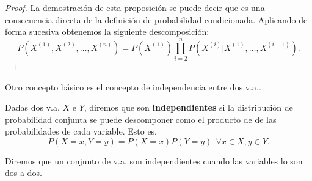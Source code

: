 \begin{proof}
    La demostración de esta proposición se puede decir que es una consecuencia directa de la definición de probabilidad condicionada. Aplicando de forma sucesiva obtenemos la siguiente descomposición:
    \begin{equation}
        P(X^{(1)}, X^{(2)}, \ldots, X^{(n)}) = P(X^{(1)}) \prod_{i=2}^n P(X^{(i)}|X^{(1)}, \ldots, X^{(i-1)}).
    \end{equation}
\end{proof}

Otro concepto básico es el concepto de independencia entre dos \ac{v.a.}.
\begin{definition}
    Dadas dos \ac{v.a.} $X$ e $Y$, diremos que son \textbf{independientes} si la distribución de probabilidad conjunta se puede descomponer como el producto de de las probabilidades de cada variable. Esto es,
    \begin{equation}
        P(X=x, Y=y)=P(X=x)P(Y=y)\ \ \forall x \in X, y \in Y.
    \end{equation}
\end{definition}

Diremos que un conjunto de \ac{v.a.} son independientes cuando las variables lo son dos a dos.

